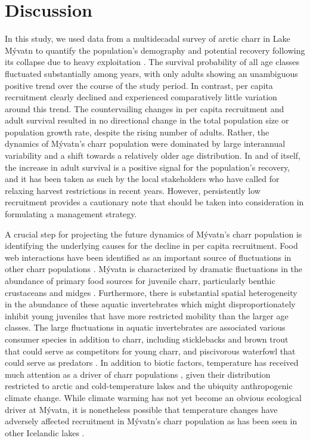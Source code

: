 
\section*{Discussion}

In this study, 
we used data from a multidecadal survey of arctic charr in Lake M\'{y}vatn
to quantify the population's demography and potential recovery 
following its collapse due to heavy exploitation 
\citep{gudbergsson2004}.
The survival probability of all age classes fluctuated substantially among years,
with only adults showing an unambiguous positive trend over the course of the study period.
In contrast, per capita recruitment clearly declined and experienced comparatively little
variation around this trend.
The countervailing changes in  per capita recruitment and adult survival resulted 
in no directional change in the total population size or population growth rate,
despite the rising number of adults.
Rather, the dynamics of  M\'{y}vatn's charr population 
were dominated by large interannual variability
and a shift towards a relatively older age distribution.
In and of itself, the increase in adult survival 
is a positive signal for the population's recovery,
and it has been taken as such by the local stakeholders 
who have called for relaxing harvest restrictions in recent years.
However, persistently low recruitment provides a cautionary note 
that should be taken into consideration in formulating a management strategy.

A crucial step for projecting the future dynamics of M\'{y}vatn’s charr population 
is identifying the underlying causes for the decline in per capita recruitment.
Food web interactions have been identified as an important source 
of fluctuations in other charr populations 
\citep{snorrason1992population, amundsen1994piscivory, jonsson2015freshwater}.
M\'{y}vatn is characterized by dramatic fluctuations in the abundance 
of primary food sources for juvenile charr, particularly benthic crustaceans 
and midges 
\citep{einarsson2004clad, gardarsson2004population, gudbergsson2004}.
Furthermore, there is substantial spatial heterogeneity in the abundance 
of these aquatic invertebrates \citep{bartrons2015spatial} 
which might disproportionately inhibit young juveniles 
that have more restricted mobility than the larger age classes. 
The large fluctuations in aquatic invertebrates are associated various consumer species 
in addition to charr, including sticklebacks and brown trout that could serve 
as competitors for young charr, and piscivorous waterfowl that could serve as predators 
\citep{einarsson2004myvatn}. 
In addition to biotic factors, 
temperature has received much attention as a driver of charr populations 
\citep{winfield2008arctic, elliott2010temperature, jonsson2015freshwater},
given their distribution restricted to arctic
and cold-temperature lakes \citep{klemetsen2003atlantic}
and the ubiquity anthropogenic climate change. 
While climate warming has not yet become an obvious ecological driver at M\'{y}vatn, 
it is nonetheless possible that temperature changes have adversely affected recruitment 
in M\'{y}vatn’s charr population as has been seen in other Icelandic lakes 
\citep{malmquist2009salmonid}. 

